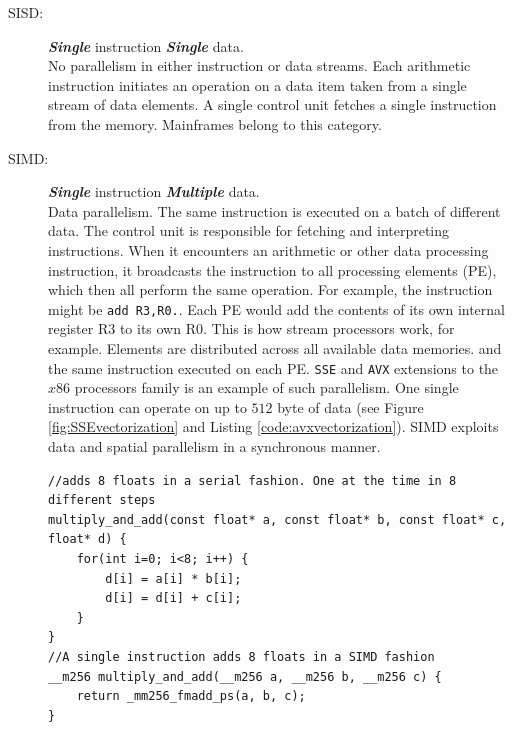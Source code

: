 \begin{description}

\item[SISD:] \textit{\textbf{Single}} instruction \textit{\textbf{Single}}
data.\hfill\\
No parallelism in either instruction or data streams. Each arithmetic
instruction initiates an operation on a data item taken from a single stream of data elements. A single control unit fetches a single instruction from the memory. Mainframes belong to this category.
\item[SIMD:] \textit{\textbf{Single}} instruction
\textit{\textbf{Multiple}} data. \hfill \\ Data parallelism. The same
instruction is executed on a batch of different data. The control unit is
responsible for fetching and interpreting instructions. When it encounters an
arithmetic or other data processing instruction, it broadcasts the instruction
to all processing elements (PE), which then all perform the same operation. For
example, the instruction might be \texttt{add R3,R0.}. Each PE would add the
contents of its own internal register R3 to its own R0. This is how stream
processors work, for example. Elements are distributed across all available data memories. and the same instruction executed on each PE. \texttt{SSE} and \texttt{AVX} extensions to the $x86$ processors family is an example of such parallelism. One single instruction can operate on up to $512$ byte of data (see Figure \ref{fig:SSEvectorization} and Listing \ref{code:avxvectorization}). SIMD exploits data and spatial parallelism in a synchronous manner.

\begin{lstlisting}
//adds 8 floats in a serial fashion. One at the time in 8 different steps
multiply_and_add(const float* a, const float* b, const float* c, float* d) {  
	for(int i=0; i<8; i++) {
		d[i] = a[i] * b[i];
		d[i] = d[i] + c[i];
	}
}
//A single instruction adds 8 floats in a SIMD fashion
__m256 multiply_and_add(__m256 a, __m256 b, __m256 c) {
	return _mm256_fmadd_ps(a, b, c);
}
\end{lstlisting}


\end{description}
